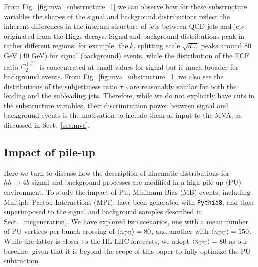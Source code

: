 From Fig.~\ref{fig:mva_substructure_1}
we can observe how for these substructure variables the shapes of the signal
and background distributions reflect
the inherent differences in the internal structure of jets
between QCD jets and jets originated from the Higgs decays.
%
Signal and background distributions peak
in rather
different regions: for example, the $k_t$ splitting scale $\sqrt{d_{12}}$
peaks around 80 GeV (40 GeV) for signal (background) events, while
the distribution of the
ECF ratio $C_2^{(\beta)}$ is concentrated at small values
for signal but is much broader for background events.
%
From Fig.~\ref{fig:mva_substructure_1} we also see
the distributions of the subjettiness ratio $\tau_{12}$ are
reasonably similar
for both the leading and the subleading jets.
%
Therefore, while we do not explicitly have cuts in the substructure
variables, their discrimination power between signal and
background events is the motivation to include them
as input to the MVA, as discussed in Sect.~\ref{sec:mva}.


\subsection{Impact of pile-up}
\label{sec:pileup}

Here we turn to discuss how the description of kinematic
distributions for $hh\to 4b$ signal
and background processes are
modified in a high pile-up (PU) environment.
%
To study the impact of PU,
Minimum Bias (MB) events,
including Multiple Parton Interactions (MPI), have been generated
with {\tt Pythia8}, and then
superimposed to the signal
and background samples described in Sect.~\ref{mcgeneration}.
%
We have explored two scenarios,
one with a mean number of
PU vertices per bunch crossing of $\left\langle n_{\rm PU}\right\rangle=80$, and another
with $\left\langle n_{\rm PU}\right\rangle=150$.
%
While the latter is closer to the HL-LHC forecasts,
we adopt $\left\langle n_{\rm PU}\right\rangle=80$ as our baseline,
given that it
is beyond the scope of this paper to fully optimize
the PU subtraction.

